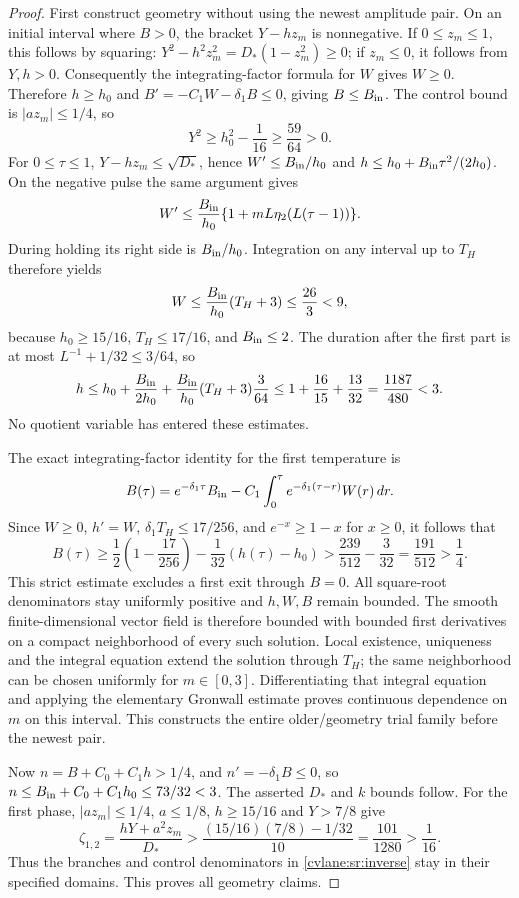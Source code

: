 \begin{proof}
First construct geometry without using the newest amplitude pair.
On an initial interval where $B>0$, the bracket $Y-hz_m$ is
nonnegative. If $0\leq z_m\leq1$, this follows by squaring:
$Y^2-h^2z_m^2=D_*(1-z_m^2)\geq0$; if $z_m\leq0$, it follows
from $Y,h>0$. Consequently the integrating-factor formula for $W$
gives $W\geq0$. Therefore $h\geq h_0$ and
$B'=-C_1W-\delta_1B\leq0$, giving $B\leq B_{\rm in}$.
The control bound is $|az_m|\leq1/4$, so
\[
 Y^2\geq h_0^2-\frac1{16}\geq\frac{59}{64}>0.
\]
For $0\leq\tau\leq1$, $Y-hz_m\leq\sqrt{D_*}$, hence
$W'\leq B_{\rm in}/h_0$ and
$h\leq h_0+B_{\rm in}\tau^2/(2h_0)$.
On the negative pulse the same argument gives
\[
 W'\leq\frac{B_{\rm in}}{h_0}
          \{1+mL\eta_2(L(\tau-1))\}.
\]
During holding its right side is $B_{\rm in}/h_0$.
Integration on any interval up to $T_H$ therefore yields
\[
 W\leq\frac{B_{\rm in}}{h_0}(T_H+3)
 \leq\frac{26}{3}<9,
\]
because $h_0\geq15/16$, $T_H\leq17/16$, and $B_{\rm in}\leq2$.
The duration after the first part is at most
$L^{-1}+1/32\leq3/64$, so
\[
 h\leq h_0+\frac{B_{\rm in}}{2h_0}
       +\frac{B_{\rm in}}{h_0}(T_H+3)\frac3{64}
 \leq1+\frac{16}{15}+\frac{13}{32}
 =\frac{1187}{480}<3.
\]
No quotient variable has entered these estimates.

The exact integrating-factor identity for the first temperature is
\[
 B(\tau)=e^{-\delta_1\tau}B_{\rm in}
  -C_1\int_0^\tau e^{-\delta_1(\tau-r)}W(r)\,dr.
\]
Since $W\geq0$, $h'=W$, $\delta_1T_H\leq17/256$, and
$e^{-x}\geq1-x$ for $x\geq0$, it follows that
\[
 B(\tau)\geq\frac12\left(1-\frac{17}{256}\right)
          -\frac1{32}(h(\tau)-h_0)
 >\frac{239}{512}-\frac3{32}
 =\frac{191}{512}>\frac14.
\]
This strict estimate excludes a first exit through $B=0$.
All square-root denominators stay uniformly positive and $h,W,B$
remain bounded. The smooth finite-dimensional vector field is therefore
bounded with bounded first derivatives on a compact neighborhood
of every such solution. Local existence, uniqueness and the integral
equation extend the solution through $T_H$; the same neighborhood
can be chosen uniformly for $m\in[0,3]$. Differentiating that integral
equation and applying the elementary Gronwall estimate proves
continuous dependence on $m$ on this interval. This constructs the
entire older/geometry trial family before the newest pair.

Now $n=B+C_0+C_1h>1/4$, and
$n'=-\delta_1B\leq0$, so
$n\leq B_{\rm in}+C_0+C_1h_0\leq73/32<3$.
The asserted $D_*$ and $k$ bounds follow. For the first phase,
$|az_m|\leq1/4$, $a\leq1/8$, $h\geq15/16$ and $Y>7/8$
give
\[
 \zeta_{1,2}=\frac{hY+a^2z_m}{D_*}
 >\frac{(15/16)(7/8)-1/32}{10}
 =\frac{101}{1280}>\frac1{16}.
\]
Thus the branches and control denominators in \eqref{cvlane:sr:inverse}
stay in their specified domains. This proves all geometry claims.


\end{proof}
